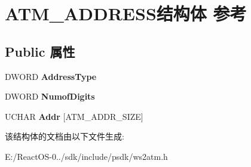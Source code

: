 \hypertarget{struct_a_t_m___a_d_d_r_e_s_s}{}\section{A\+T\+M\+\_\+\+A\+D\+D\+R\+E\+S\+S结构体 参考}
\label{struct_a_t_m___a_d_d_r_e_s_s}
\subsection*{Public 属性}
\begin{DoxyCompactItemize}
\item 
\mbox{\label{struct_a_t_m___a_d_d_r_e_s_s_ae183f5c3e338f67399a28bcca41bafb0}} 
D\+W\+O\+RD {\bfseries Address\+Type}
\item 
\mbox{\label{struct_a_t_m___a_d_d_r_e_s_s_abfac9b1ebe60bf7773a02c464ea03831}} 
D\+W\+O\+RD {\bfseries Numof\+Digits}
\item 
\mbox{\label{struct_a_t_m___a_d_d_r_e_s_s_a544cc3604f5a338ffd37930786d2a0c8}} 
U\+C\+H\+AR {\bfseries Addr} \mbox{[}A\+T\+M\+\_\+\+A\+D\+D\+R\+\_\+\+S\+I\+ZE\mbox{]}
\end{DoxyCompactItemize}


该结构体的文档由以下文件生成\+:\begin{DoxyCompactItemize}
\item 
E\+:/\+React\+O\+S-\/0../sdk/include/psdk/ws2atm.\+h\end{DoxyCompactItemize}

